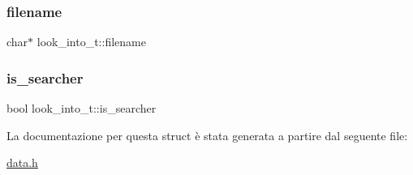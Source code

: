 \mbox{\label{structlook__into__t_aac2e0d99d8a29764003eb408fe9a0992}} 
\subsubsection{\texorpdfstring{filename}{filename}}
{\footnotesize\ttfamily char$\ast$ look\+\_\+into\+\_\+t\+::filename}

\mbox{\label{structlook__into__t_a4f74ba613ccae77bdec049edb078e8c0}} 
\subsubsection{\texorpdfstring{is\+\_\+searcher}{is\_searcher}}
{\footnotesize\ttfamily bool look\+\_\+into\+\_\+t\+::is\+\_\+searcher}



La documentazione per questa struct è stata generata a partire dal seguente file\+:\begin{DoxyCompactItemize}
\item 
\hyperlink{data_8h}{data.\+h}\end{DoxyCompactItemize}
